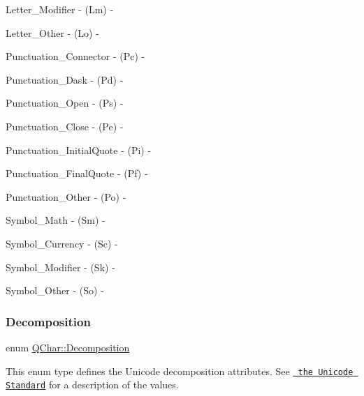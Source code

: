 \begin{DoxyItemize}
\item {\ttfamily Letter\+\_\+\+Modifier} -\/ (Lm) -\/


\item {\ttfamily Letter\+\_\+\+Other} -\/ (Lo) -\/


\item {\ttfamily Punctuation\+\_\+\+Connector} -\/ (Pc) -\/


\item {\ttfamily Punctuation\+\_\+\+Dask} -\/ (Pd) -\/


\item {\ttfamily Punctuation\+\_\+\+Open} -\/ (Ps) -\/


\item {\ttfamily Punctuation\+\_\+\+Close} -\/ (Pe) -\/


\item {\ttfamily Punctuation\+\_\+\+Initial\+Quote} -\/ (Pi) -\/


\item {\ttfamily Punctuation\+\_\+\+Final\+Quote} -\/ (Pf) -\/


\item {\ttfamily Punctuation\+\_\+\+Other} -\/ (Po) -\/


\item {\ttfamily Symbol\+\_\+\+Math} -\/ (Sm) -\/


\item {\ttfamily Symbol\+\_\+\+Currency} -\/ (Sc) -\/


\item {\ttfamily Symbol\+\_\+\+Modifier} -\/ (Sk) -\/


\item {\ttfamily Symbol\+\_\+\+Other} -\/ (So) -\/


\end{DoxyItemize}\mbox{\label{class_q_char_a13be45046e82a6d2991cef0b7c18d522}} 
\subsubsection{\texorpdfstring{Decomposition}{Decomposition}}
{\footnotesize\ttfamily enum \mbox{\hyperlink{class_q_char_a13be45046e82a6d2991cef0b7c18d522}{Q\+Char\+::\+Decomposition}}}

This enum type defines the Unicode decomposition attributes. See \href{http://www.unicode.org}{\texttt{ the Unicode Standard}} for a description of the values. \mbox{\label{class_q_char_a54978126be7630b3e85394325a822302}} 
